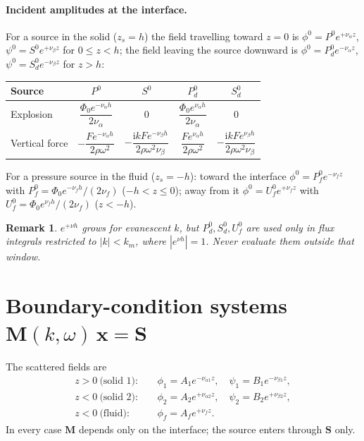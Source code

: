 \documentclass[11pt,a4paper]{article}
\newcommand{\ii}{\mathrm{i}}
\newtheorem{remark}{Remark}
\begin{document}
\paragraph{Incident amplitudes at the interface.}
For a source in the solid ($z_s=h$) the field travelling toward $z=0$ is
$\phi^0=P^0e^{+\nu_\alpha z}$, $\psi^0=S^0e^{+\nu_\beta z}$ for $0\le z<h$; the field leaving
the source downward is $\phi^0=P_d^0e^{-\nu_\alpha z}$, $\psi^0=S_d^0e^{-\nu_\beta z}$ for $z>h$:
\begin{center}
\renewcommand{\arraystretch}{1.5}
\begin{tabular}{@{}lcccc@{}}
\toprule
Source & $P^0$ & $S^0$ & $P^0_d$ & $S^0_d$\\
\midrule
Explosion & $\dfrac{\Phi_0e^{-\nu_\alpha h}}{2\nu_\alpha}$ & $0$
          & $\dfrac{\Phi_0e^{\nu_\alpha h}}{2\nu_\alpha}$ & $0$\\
Vertical force & $-\dfrac{Fe^{-\nu_\alpha h}}{2\rho\omega^2}$ & $-\dfrac{\ii kFe^{-\nu_\beta h}}{2\rho\omega^2\nu_\beta}$
               & $\dfrac{Fe^{\nu_\alpha h}}{2\rho\omega^2}$ & $-\dfrac{\ii kFe^{\nu_\beta h}}{2\rho\omega^2\nu_\beta}$\\
\bottomrule
\end{tabular}
\end{center}
For a pressure source in the fluid ($z_s=-h$): toward the interface
$\phi^0=P_f^0e^{-\nu_f z}$ with $P_f^0=\Phi_0e^{-\nu_f h}/(2\nu_f)$ ($-h<z\le0$); away from it
$\phi^0=U_f^0e^{+\nu_f z}$ with $U_f^0=\Phi_0e^{\nu_f h}/(2\nu_f)$ ($z<-h$).

\begin{remark}
$e^{+\nu h}$ grows for evanescent $k$, but $P_d^0,S_d^0,U_f^0$ are used only in flux integrals
restricted to $|k|<k_m$, where $|e^{\nu h}|=1$. Never evaluate them outside that window.
\end{remark}

\section{Boundary-condition systems \texorpdfstring{$\mathbf M(k,\omega)\,\mathbf x=\mathbf S$}{M x = S}}

The scattered fields are
\begin{align}
  z>0\ \text{(solid 1)}:&\quad \phi_1=A_1e^{-\nu_{\alpha1}z},\quad \psi_1=B_1e^{-\nu_{\beta1}z},\\
  z<0\ \text{(solid 2)}:&\quad \phi_2=A_2e^{+\nu_{\alpha2}z},\quad \psi_2=B_2e^{+\nu_{\beta2}z},\\
  z<0\ \text{(fluid)}:&\quad \phi_f=A_fe^{+\nu_{f}z}.
\end{align}
In every case $\mathbf M$ depends only on the interface; the source enters through $\mathbf S$ only.
\end{document}
